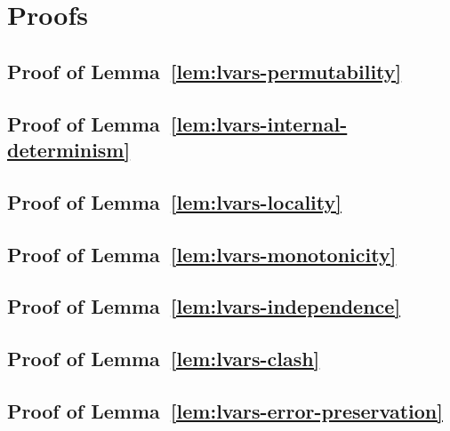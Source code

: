 \chapter{Proofs}\label{app:proofs}

\section{Proof of Lemma~\ref{lem:lvars-permutability}}\label{section:lvars-permutability-proof}


\section{Proof of Lemma~\ref{lem:lvars-internal-determinism}}\label{section:lvars-internal-determinism-proof}


\section{Proof of Lemma~\ref{lem:lvars-locality}}\label{section:lvars-locality-proof}


\section{Proof of Lemma~\ref{lem:lvars-monotonicity}}\label{section:lvars-monotonicity-proof}


\section{Proof of Lemma~\ref{lem:lvars-independence}}\label{section:lvars-independence-proof}


\section{Proof of Lemma~\ref{lem:lvars-clash}}\label{section:lvars-clash-proof}


\section{Proof of Lemma~\ref{lem:lvars-error-preservation}}\label{section:lvars-error-preservation-proof}


